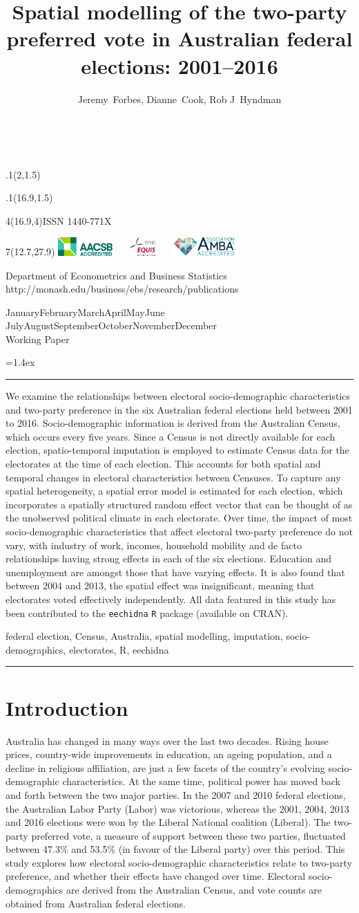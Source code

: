 \documentclass[11pt,a4paper,]{article}
\title{Spatial modelling of the two-party preferred vote in Australian federal elections: 2001--2016}
\author{Jeremy~Forbes, Dianne~Cook, Rob J~Hyndman}
\date{\sf\Date~\Month~\Year}
\makeatletter
\def\Date{\number\day}
\def\Month{\ifcase\month\or
 January\or February\or March\or April\or May\or June\or
 July\or August\or September\or October\or November\or December\fi}
\def\Year{\number\year}
\def\showjel{{\large\textsf{\textbf{JEL classification:}}~\@jel}}
\def\cover{{\sffamily\setcounter{page}{0}
        \thispagestyle{empty}
        \placefig{2}{1.5}{width=5cm}{monash2}
        \placefig{16.9}{1.5}{width=2.1cm}{MBusSchool}
        \begin{textblock}{4}(16.9,4)ISSN 1440-771X\end{textblock}
        \begin{textblock}{7}(12.7,27.9)\hfill
        \includegraphics[height=0.7cm]{AACSB}~~~
        \includegraphics[height=0.7cm]{EQUIS}~~~
        \includegraphics[height=0.7cm]{AMBA}
        \end{textblock}
        \vspace*{2cm}
        \begin{center}\Large
        Department of Econometrics and Business Statistics\\[.5cm]
        \footnotesize http://monash.edu/business/ebs/research/publications
        \end{center}\vspace{2cm}
        \begin{center}
        \fbox{\parbox{14cm}{\begin{onehalfspace}\centering\Huge\vspace*{0.3cm}
                \textsf{\textbf{\expandafter{\@title}}}\vspace{1cm}\par
                \LARGE\@author\end{onehalfspace}
        }}
        \end{center}
        \vfill
                \begin{center}\Large
                \Month~\Year\\[1cm]
                Working Paper \@wp
        \end{center}\vspace*{2cm}}}
\def\pageone{{\sffamily\setstretch{1}%
        \thispagestyle{empty}%
        \vbox to \textheight{%
        \raggedright\baselineskip=1.2cm
     {\fontsize{24.88}{30}\sffamily\textbf{\expandafter{\@title}}}
        \vspace{2cm}\par
        \hspace{1cm}\parbox{14cm}{\sffamily\large\@addresses}\vspace{1cm}\vfill
        \hspace{1cm}{\large\Date~\Month~\Year}\\[1cm]
        \hspace{1cm}\showjel\vss}}}
\def\blindtitle{{\sffamily
     \thispagestyle{plain}\raggedright\baselineskip=1.2cm
     {\fontsize{24.88}{30}\sffamily\textbf{\expandafter{\@title}}}\vspace{1cm}\par
        }}
\def\titlepage{{\cover\newpage\pageone\newpage\blindtitle}}
\let\maketitle\titlepage
\newenvironment{keywords}{\par\vspace{0.5cm}\noindent{\sffamily\textbf{Keywords:}}}{\vspace{0.25cm}\par\hrule\vspace{0.5cm}\par}
\renewenvironment{abstract}{\begin{minipage}{\textwidth}\parskip=1.4ex\noindent
\hrule\vspace{0.1cm}\par{\sffamily\textbf{\abstractname}}\newline}
  {\end{minipage}}
\def\placefig#1#2#3#4{\begin{textblock}{.1}(#1,#2)\rlap{\texttt{[image: \#4]}}\end{textblock}}
\makeatother
\begin{document}
\maketitle
\begin{abstract}
We examine the relationships between electoral socio-demographic characteristics and two-party preference in the six Australian federal elections held between 2001 to 2016. Socio-demographic information is derived from the Australian Census, which occurs every five years. Since a Census is not directly available for each election, spatio-temporal imputation is employed to estimate Census data for the electorates at the time of each election. This accounts for both spatial and temporal changes in electoral characteristics between Censuses. To capture any spatial heterogeneity, a spatial error model is estimated for each election, which incorporates a spatially structured random effect vector that can be thought of as the unobserved political climate in each electorate. Over time, the impact of most socio-demographic characteristics that affect electoral two-party preference do not vary, with industry of work, incomes, household mobility and de facto relationships having strong effects in each of the six elections. Education and unemployment are amongst those that have varying effects. It is also found that between 2004 and 2013, the spatial effect was insignificant, meaning that electorates voted effectively independently. All data featured in this study has been contributed to the \texttt{eechidna} \texttt{R} package (available on CRAN).
\end{abstract}
\begin{keywords}
federal election, Census, Australia, spatial modelling, imputation, socio-demographics, electorates, R, eechidna
\end{keywords}

\hypertarget{intro}{%
\section{Introduction}\label{intro}}

Australia has changed in many ways over the last two decades. Rising house prices, country-wide improvements in education, an ageing population, and a decline in religious affiliation, are just a few facets of the country's evolving socio-demographic characteristics. At the same time, political power has moved back and forth between the two major parties. In the 2007 and 2010 federal elections, the Australian Labor Party (Labor) was victorious, whereas the 2001, 2004, 2013 and 2016 elections were won by the Liberal National coalition (Liberal). The two-party preferred vote, a measure of support between these two parties, fluctuated between 47.3\% and 53.5\% (in favour of the Liberal party) over this period. This study explores how electoral socio-demographic characteristics relate to two-party preference, and whether their effects have changed over time. Electoral socio-demographics are derived from the Australian Census, and vote counts are obtained from Australian federal elections.
\end{document}
